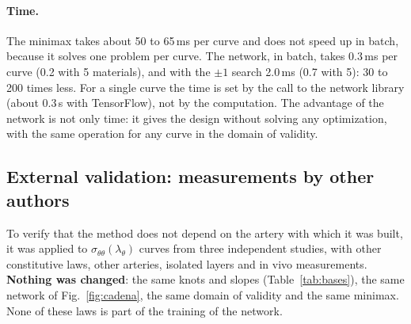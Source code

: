 \paragraph{Time.} The minimax takes about 50 to 65\,ms per curve and does not speed up in batch, because it solves one problem per curve. The network, in batch, takes 0.3\,ms per curve (0.2 with 5 materials), and with the $\pm1$ search 2.0\,ms (0.7 with 5): 30 to 200 times less. For a single curve the time is set by the call to the network library (about 0.3\,s with TensorFlow), not by the computation. The advantage of the network is not only time: it gives the design without solving any optimization, with the same operation for any curve in the domain of validity.

\subsection{External validation: measurements by other authors}\label{sec:externa}
To verify that the method does not depend on the artery with which it was built, it was applied to $\sigma_{\theta\theta}(\lambda_\theta)$ curves from three independent studies, with other constitutive laws, other arteries, isolated layers and in vivo measurements. \textbf{Nothing was changed}: the same knots and slopes (Table~\ref{tab:bases}), the same network of Fig.~\ref{fig:cadena}, the same domain of validity and the same minimax. None of these laws is part of the training of the network.

